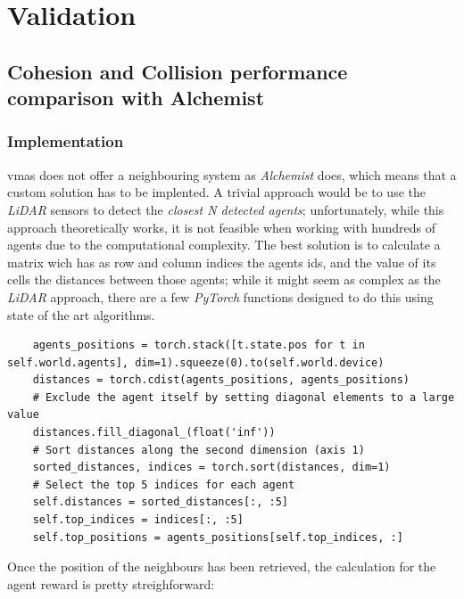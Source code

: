 \documentclass[12pt,a4paper,openright,twoside]{book}
\begin{document}
\chapter{Validation} %
\label{chap:validation}

\section{Cohesion and Collision performance comparison with Alchemist}
\subsection{Implementation}
\ac{vmas} does not offer a neighbouring system as \emph{Alchemist} does, which means that a custom solution has to be implented. 
A trivial approach would be to use the \emph{LiDAR} sensors to detect the \emph{closest N detected agents}; unfortunately, while this approach theoretically works, it is not feasible when working with hundreds of agents due to the computational complexity.
The best solution is to calculate a matrix wich has as row and column indices the agents ids, and the value of its cells the distances between those agents; while it might seem as complex as the \emph{LiDAR} approach, there are a few \emph{PyTorch} functions designed to do this using state of the art algorithms.
\begin{lstlisting}
    agents_positions = torch.stack([t.state.pos for t in self.world.agents], dim=1).squeeze(0).to(self.world.device)
    distances = torch.cdist(agents_positions, agents_positions)
    # Exclude the agent itself by setting diagonal elements to a large value
    distances.fill_diagonal_(float('inf'))
    # Sort distances along the second dimension (axis 1)
    sorted_distances, indices = torch.sort(distances, dim=1)
    # Select the top 5 indices for each agent
    self.distances = sorted_distances[:, :5]
    self.top_indices = indices[:, :5]
    self.top_positions = agents_positions[self.top_indices, :]
\end{lstlisting}
Once the position of the neighbours has been retrieved, the calculation for the agent reward is pretty streighforward:
\end{document}
